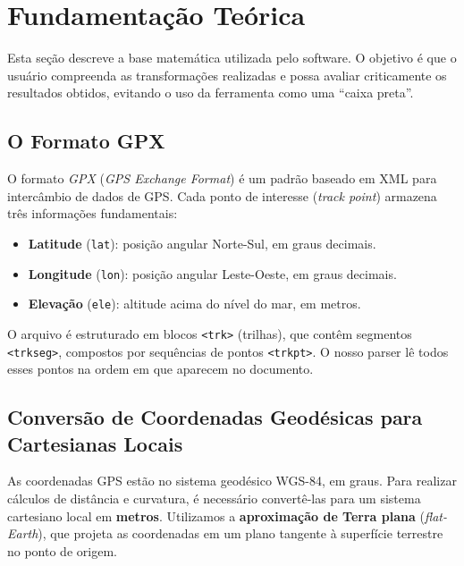 \documentclass[a4paper,12pt]{article}
\begin{document}
\section{Fundamentação Teórica}

Esta seção descreve a base matemática utilizada pelo software. O objetivo é que o usuário compreenda as transformações realizadas e possa avaliar criticamente os resultados obtidos, evitando o uso da ferramenta como uma ``caixa preta''.

\subsection{O Formato GPX}

O formato \textit{GPX} (\textit{GPS Exchange Format}) é um padrão baseado em XML para intercâmbio de dados de GPS. Cada ponto de interesse (\textit{track point}) armazena três informações fundamentais:

\begin{itemize}
    \item \textbf{Latitude} (\texttt{lat}): posição angular Norte-Sul, em graus decimais.
    \item \textbf{Longitude} (\texttt{lon}): posição angular Leste-Oeste, em graus decimais.
    \item \textbf{Elevação} (\texttt{ele}): altitude acima do nível do mar, em metros.
\end{itemize}

O arquivo é estruturado em blocos \texttt{<trk>} (trilhas), que contêm segmentos \texttt{<trkseg>}, compostos por sequências de pontos \texttt{<trkpt>}. O nosso parser lê todos esses pontos na ordem em que aparecem no documento.

\subsection{Conversão de Coordenadas Geodésicas para Cartesianas Locais}

As coordenadas GPS estão no sistema geodésico WGS-84, em graus. Para realizar cálculos de distância e curvatura, é necessário convertê-las para um sistema cartesiano local em \textbf{metros}. Utilizamos a \textbf{aproximação de Terra plana} (\textit{flat-Earth}), que projeta as coordenadas em um plano tangente à superfície terrestre no ponto de origem.
\end{document}
